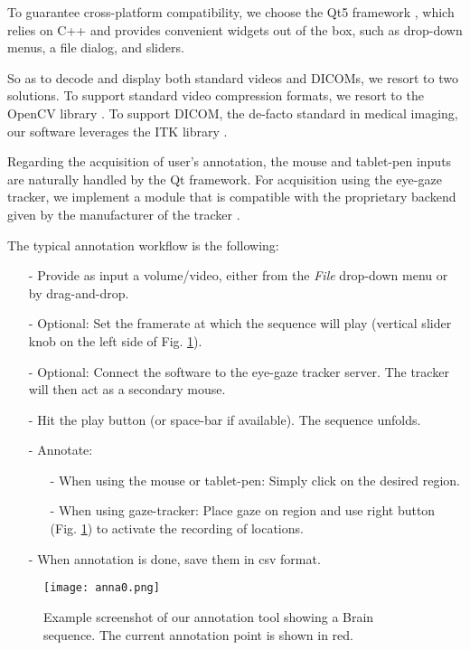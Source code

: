 To guarantee cross-platform compatibility, we choose the Qt5 framework \cite{eng16}, which relies on C++ and provides convenient widgets out of the box, such as drop-down menus, a file dialog, and sliders.

So as to decode and display both standard videos and DICOMs, we resort to two solutions.
To support standard video compression formats, we resort to the OpenCV library \cite{opencv}.
To support DICOM, the de-facto standard in medical imaging, our software leverages the ITK library \cite{johnson15}.

Regarding the acquisition of user's annotation, the mouse and tablet-pen inputs are naturally handled by the Qt framework.
For acquisition using the eye-gaze tracker, we implement a module that is compatible with the proprietary backend given by the manufacturer of the tracker \cite{eyetribe}.

The typical annotation workflow is the following:

\begin{itemize}
  \item[-]{Provide as input a volume/video, either from the \textit{File} drop-down menu or by drag-and-drop.}
  \item[-]{Optional: Set the framerate at which the sequence will play (vertical slider knob on the left side of Fig. \ref{fig:anna}).}
  \item[-]{Optional: Connect the software to the eye-gaze tracker server. The tracker will then act as a secondary mouse.}
  \item[-]{Hit the play button (or space-bar if available). The sequence unfolds.}
  \item[-]{Annotate:}
    \begin{itemize}
      \item[-]{When using the mouse or tablet-pen: Simply click on the desired region.}
      \item[-]{When using gaze-tracker: Place gaze on region and use right button (Fig. \ref{fig:anna}) to activate the recording of locations.}
    \end{itemize}
  \item[-]{When annotation is done, save them in \gls{csv} format.}
\end{itemize}

\begin{figure}[!htpb]
  \texttt{[image: anna0.png]}
  \caption{Example screenshot of our annotation tool showing a Brain sequence.
  The current annotation point is shown in red.}
  \label{fig:anna}
\end{figure}

